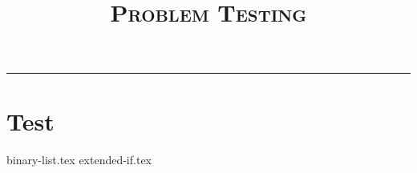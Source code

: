 \documentclass{exam}
\title{\textsc{Problem Testing}}
\begin{document}
\maketitle
\rule{\textwidth}{0.15em}
\fontsize{12}{15}\selectfont

\section{Test}
\begin{questions}
{binary-list.tex}
{extended-if.tex}
\end{questions}
\end{document}
